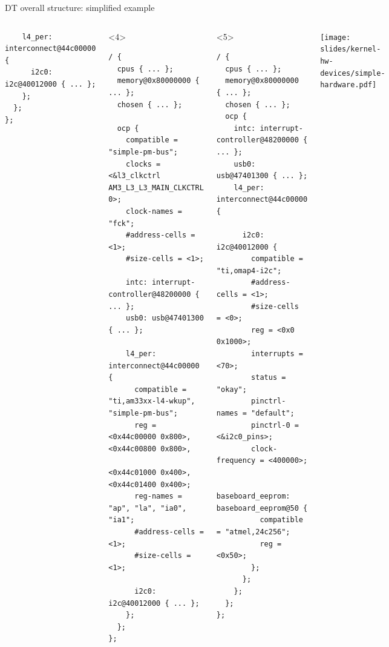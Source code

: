 \begin{frame}[fragile]{DT overall structure: simplified example}
\begin{columns}
\begin{onlyenv}
\begin{block}{}
\begin{verbatim}
    l4_per: interconnect@44c00000 {
      i2c0: i2c@40012000 { ... };
    };
  };
};
\end{verbatim}
      \end{block}
    \end{onlyenv}
    \begin{onlyenv}<4>
      \begin{block}{}
\begin{verbatim}
/ {
  cpus { ... };
  memory@0x80000000 { ... };
  chosen { ... };

  ocp {
    compatible = "simple-pm-bus";
    clocks = <&l3_clkctrl AM3_L3_L3_MAIN_CLKCTRL 0>;
    clock-names = "fck";
    #address-cells = <1>;
    #size-cells = <1>;

    intc: interrupt-controller@48200000 { ... };
    usb0: usb@47401300 { ... };

    l4_per: interconnect@44c00000 {
      compatible = "ti,am33xx-l4-wkup", "simple-pm-bus";
      reg = <0x44c00000 0x800>, <0x44c00800 0x800>,
            <0x44c01000 0x400>, <0x44c01400 0x400>;
      reg-names = "ap", "la", "ia0", "ia1";
      #address-cells = <1>;
      #size-cells = <1>;

      i2c0: i2c@40012000 { ... };
    };
  };
};
\end{verbatim}
      \end{block}
    \end{onlyenv}
    \begin{onlyenv}<5>
      \begin{block}{}
\begin{verbatim}
/ {
  cpus { ... };
  memory@0x80000000 { ... };
  chosen { ... };
  ocp {
    intc: interrupt-controller@48200000 { ... };
    usb0: usb@47401300 { ... };
    l4_per: interconnect@44c00000 {

      i2c0: i2c@40012000 {
        compatible = "ti,omap4-i2c";
        #address-cells = <1>;
        #size-cells = <0>;
        reg = <0x0 0x1000>;
        interrupts = <70>;
        status = "okay";
        pinctrl-names = "default";
        pinctrl-0 = <&i2c0_pins>;
        clock-frequency = <400000>;

        baseboard_eeprom: baseboard_eeprom@50 {
          compatible = "atmel,24c256";
          reg = <0x50>;
        };
      };
    };
  };
};
\end{verbatim}
      \end{block}
    \end{onlyenv}
    \texttt{[image: slides/kernel-hw-devices/simple-hardware.pdf]}
  \end{columns}
\end{frame}

